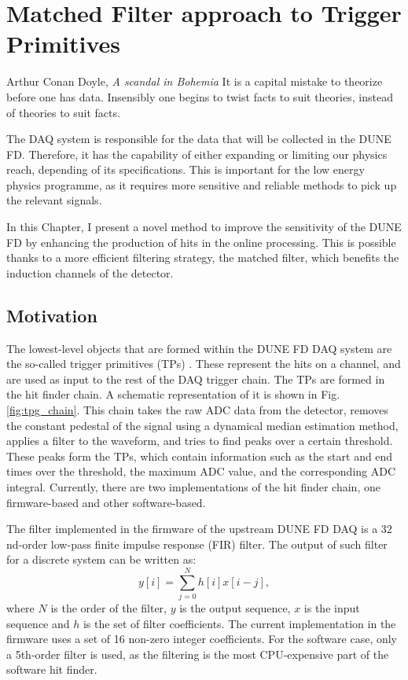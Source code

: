 \chapter{Matched Filter approach to Trigger Primitives}\label{chapter:matched_filter}

\begin{chapquote}{Arthur Conan Doyle, \textit{A scandal in Bohemia}}
	It is a capital mistake to theorize before one has data. Insensibly one begins to twist facts to suit theories, instead of theories to suit facts.
\end{chapquote}

The DAQ system is responsible for the data that will be collected in the DUNE FD. Therefore, it has the capability of either expanding or limiting our physics reach, depending of its specifications. This is important for the low energy physics programme, as it requires more sensitive and reliable methods to pick up the relevant signals.

In this Chapter, I present a novel method to improve the sensitivity of the DUNE FD by enhancing the production of hits in the online processing. This is possible thanks to a more efficient filtering strategy, the matched filter, which benefits the induction channels of the detector.

\section{Motivation}
\label{sec:matched_filter_motivation}

The lowest-level objects that are formed within the DUNE FD DAQ system are the so-called trigger primitives (TPs) \cite{DUNEDAQ2022}. These represent the hits on a channel, and are used as input to the rest of the DAQ trigger chain. The TPs are formed in the hit finder chain. A schematic representation of it is shown in Fig. \ref{fig:tpg_chain}. This chain takes the raw ADC data from the detector, removes the constant pedestal of the signal using a dynamical median estimation method, applies a filter to the waveform, and tries to find peaks over a certain threshold. These peaks form the TPs, which contain information such as the start and end times over the threshold, the maximum ADC value, and the corresponding ADC integral. Currently, there are two implementations of the hit finder chain, one firmware-based and other software-based.

The filter implemented in the firmware of the upstream DUNE FD DAQ is a $32$nd-order low-pass finite impulse response (FIR) filter. The output of such filter for a discrete system can be written as:
\begin{equation}\label{2.1.1}
	y[i] = \sum_{j=0}^{N} h[i] x[i-j],
\end{equation}
where $N$ is the order of the filter, $y$ is the output sequence, $x$ is the input sequence and $h$ is the set of filter coefficients. The current implementation in the firmware uses a set of 16 non-zero integer coefficients. For the software case, only a 5th-order filter is used, as the filtering is the most CPU-expensive part of the software hit finder.

